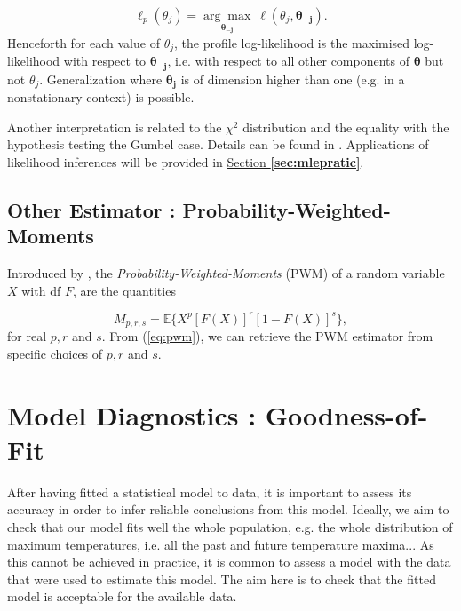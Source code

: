 \begin{equation}
\ell_p(\theta_j)=\underset{\boldsymbol{\theta_{-j}}}{\mathrm{\arg\max}}\ \ell (\theta_j,\boldsymbol{\theta_{-j}}).
\end{equation}
Henceforth for each value of $\theta_j$, the profile log-likelihood is the maximised 
log-likelihood with respect to $\boldsymbol{\theta_{-j}}$, i.e. with respect to all other 
components of $\boldsymbol{\theta}$ but not $\theta_j$.
Generalization where $\boldsymbol{\theta_j}$ is of dimension higher than one (e.g. in a nonstationary context) is possible.

Another interpretation is related to the $\chi^2$ distribution and the equality with the hypothesis testing the Gumbel case. Details can be found in \citet[pp.138]{beirlant_statistics_2006}. Applications of likelihood inferences will be provided in \hyperref[sec:mlepratic]{Section \textbf{\ref{sec:mlepratic}}}.



\subsection{Other Estimator :  Probability-Weighted-Moments}\label{sec:gevother}

Introduced by \citet{greenwood_probability_1979}, the \emph{Probability-Weighted-Moments} (PWM) of a random variable $X$ with df $F$, are the quantities 

\begin{equation}\label{eq:pwm}
M_{p,r,s}=\mathbb{E}\Big\{X^p[F(X)]^r[1-F(X)]^s\Big\},
\end{equation}
for real $p,r$ and $s$. From (\ref{eq:pwm}), we can retrieve the PWM estimator from specific choices of $p,r$ and $s$.



\section{Model Diagnostics : Goodness-of-Fit}\label{sec:diag}

After having fitted a statistical model to data, it is important to assess its accuracy in order to infer reliable conclusions from this model.
Ideally, we aim to check that our model fits well the whole population, e.g. the whole distribution of maximum temperatures, i.e. all the past and future temperature maxima... As this cannot be achieved in practice, it is common to assess a model with the data that were used to estimate this model. The aim here is to check that the fitted model is acceptable for the available data. 

